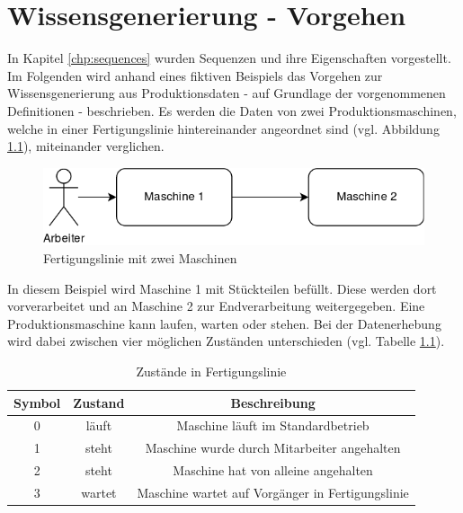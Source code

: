 \chapter{Wissensgenerierung - Vorgehen}
\label{chp:procedure}
In Kapitel \ref{chp:sequences} wurden Sequenzen und ihre Eigenschaften vorgestellt. Im Folgenden wird anhand eines fiktiven Beispiels das Vorgehen zur Wissensgenerierung aus Produktionsdaten - auf Grundlage der vorgenommenen Definitionen - beschrieben. Es werden die Daten von zwei Produktionsmaschinen, welche in einer Fertigungslinie hintereinander angeordnet sind (vgl. Abbildung \ref{fig:procedure-production-line}), miteinander verglichen.

\begin{figure}[H]
	\centering
	\includegraphics[scale=0.40]{images/procedure/production-line}
	\caption{Fertigungslinie mit zwei Maschinen}
	\label{fig:procedure-production-line}
\end{figure}

In diesem Beispiel wird Maschine 1 mit Stückteilen befüllt. Diese werden dort vorverarbeitet und an Maschine 2 zur Endverarbeitung weitergegeben. Eine Produktionsmaschine kann laufen, warten oder stehen. Bei der Datenerhebung wird dabei zwischen vier möglichen Zuständen unterschieden (vgl. Tabelle \ref{tab:procedure-status-in-production}). 

\begin{table}
	\begin{center}
		\begin{tabular}{|c c c|} 
			\hline
			Symbol & Zustand & Beschreibung \\
			\hline\hline
			0 & läuft & Maschine läuft im Standardbetrieb \\ 
			\hline
			1 & steht & Maschine wurde durch Mitarbeiter angehalten \\
			\hline
			2 & steht & Maschine hat von alleine angehalten \\
			\hline
			3 & wartet & Maschine wartet auf Vorgänger in Fertigungslinie \\
			\hline
		\end{tabular}
		\caption{Zustände in Fertigungslinie}
		\label{tab:procedure-status-in-production}
	\end{center}
\end{table}

